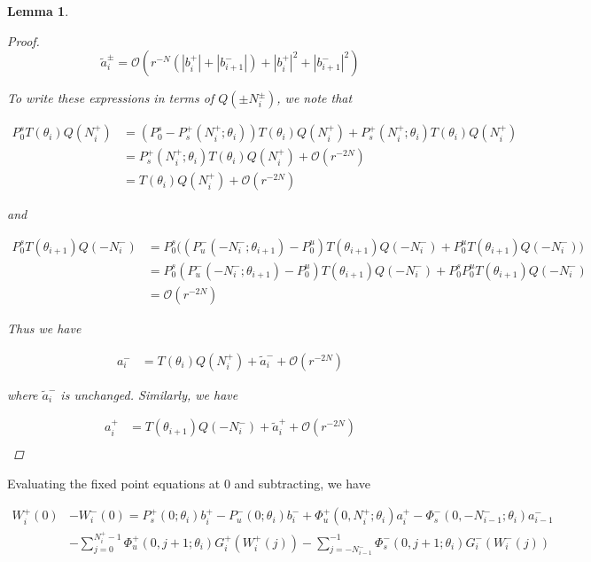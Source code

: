 \documentclass[12pt]{article}
\newtheorem{lemma}{Lemma}
\begin{document}
\begin{lemma}
\begin{proof}
\[
\tilde{a}_i^\pm = \mathcal{O}(r^{-N}(|b_i^+|+|b_{i+1}^-|) + |b_i^+|^2+|b_{i+1}^-|^2) 
\]

To write these expressions in terms of $Q(\pm N_i^\pm)$, we note that

\begin{align*}
P_0^s T(\theta_i) Q(N_i^+) &= (P_0^s - P_s^+(N_i^+; \theta_i)) T(\theta_i) Q(N_i^+) + P_s^+(N_i^+; \theta_i) T(\theta_i) Q(N_i^+) \\
&= P_s^+(N_i^+; \theta_i) T(\theta_i) Q(N_i^+) + \mathcal{O}(r^{-2N}) \\
&= T(\theta_i) Q(N_i^+) + \mathcal{O}(r^{-2N}) 
\end{align*}

and 

\begin{align*}
P_0^s T(\theta_{i+1}) Q(-N_i^-) 
&= P_0^s \Big( ( P_u^-(-N_i^-; \theta_{i+1}) - P_0^u) T(\theta_{i+1}) Q(-N_i^-) + P_0^u T(\theta_{i+1}) Q(-N_i^-) \Big) \\
&= P_0^s ( P_u^-(-N_i^-; \theta_{i+1}) - P_0^u) T(\theta_{i+1}) Q(-N_i^-) + P_0^s P_0^u T(\theta_{i+1}) Q(-N_i^-) \\
&= \mathcal{O}(r^{-2N})
\end{align*}

Thus we have

\begin{align*}
a_i^- &= T(\theta_i) Q(N_i^+) + \tilde{a}_i^- + \mathcal{O}(r^{-2N})
\end{align*}

where $\tilde{a}_i^-$ is unchanged. Similarly, we have

\begin{align*}
a_i^+ &= T(\theta_{i+1}) Q(-N_i^-) + \tilde{a}_i^+ + \mathcal{O}(r^{-2N}) \\
\end{align*}

\end{proof}
\end{lemma}


Evaluating the fixed point equations at 0 and subtracting, we have

\begin{align*}
W_i^+(0) &- W_i^-(0) = P_s^+(0; \theta_i) b_i^+ - P_u^-(0; \theta_i) b_i^- 
+ \Phi_u^+(0, N_i^+; \theta_i) a_i^+ - \Phi_s^-(0, -N_{i-1}^-; \theta_i) a_{i-1}^- \\
&- \sum_{j = 0}^{N_i^+-1} \Phi_u^+(0, j+1; \theta_i) G_i^+(W_i^+(j)) 
- \sum_{j = -N_{i-1}^-}^{-1} \Phi_s^-(0, j+1; \theta_i) G_i^-(W_i^-(j)) \\
\end{align*}
\end{document}
